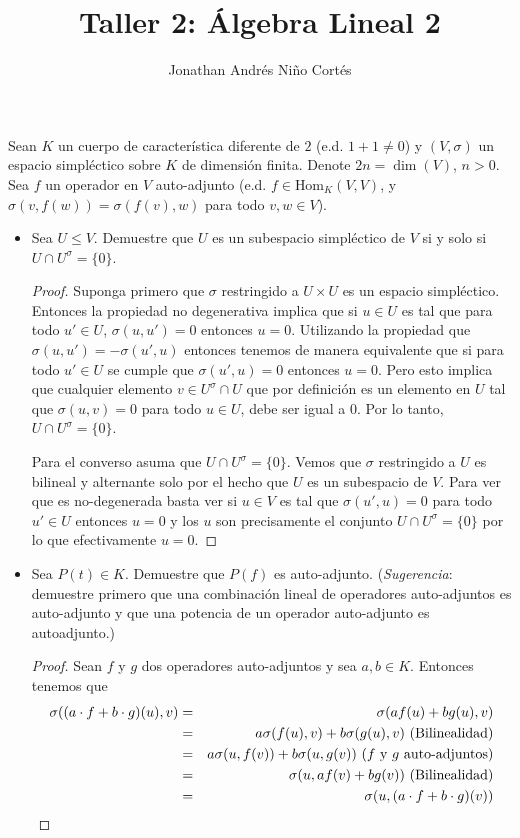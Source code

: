 \documentclass[letter,twoside,12pt]{article}
\title{Taller 2: Álgebra Lineal 2}
\author{Jonathan Andrés Niño Cortés}
\newcommand{\Hom}{\textrm{Hom}}
\begin{document}
\pagestyle{empty}
\maketitle
\vspace{0.5cm}

Sean $K$ un cuerpo de caracter\'istica diferente de $2$ (e.d. $1+1\ne 0$) y $(V,\sigma)$ un espacio simpl\'ectico sobre $K$ de dimensi\'on finita. Denote $2n=\dim(V)$, $n>0$. Sea $f$ un operador en $V$ auto-adjunto (e.d. $f\in\Hom_K(V,V)$, y $\sigma(v,f(w))=\sigma(f(v),w)$ para todo $v,w\in V$).

\begin{itemize}
\item Sea $U\le V$. Demuestre que $U$ es un subespacio simpl\'ectico de $V$ si y solo si $U\cap U^\sigma=\{0\}$.

\begin{proof}
Suponga primero que $ \sigma $ restringido a $ U \times U $ es un espacio simpléctico. Entonces la propiedad no degenerativa implica que si $ u \in U $ es tal que para todo $ u' \in U $, $ \sigma(u,u')=0 $ entonces $ u = 0 $. Utilizando la propiedad que $ \sigma(u,u')=-\sigma(u',u) $ entonces tenemos de manera equivalente que si para todo $ u' \in U $ se cumple que $ \sigma(u',u) = 0 $ entonces $ u = 0 $. Pero esto implica que cualquier elemento $ v \in U^\sigma \cap U $ que por definición es un elemento en $ U $ tal que $ \sigma(u,v)=0 $ para todo $ u \in U $, debe ser igual a 0. Por lo tanto, $ U \cap U^\sigma = \{0\} $.

Para el converso asuma que $ U \cap U^\sigma = \{0\} $. Vemos que $ \sigma $ restringido a $ U $ es bilineal y alternante solo por el hecho que $ U $ es un subespacio de $ V $. Para ver que es no-degenerada basta ver si $ u  \in V $ es tal que $ \sigma(u',u)=0 $ para todo $ u' \in U $ entonces $ u = 0 $ y los $ u $ son precisamente el conjunto $ U \cap U^\sigma= \{0\} $ por lo que efectivamente $ u = 0 $. 
\end{proof}

\item Sea $P(t)\in K$. Demuestre que $P(f)$ es auto-adjunto. (\emph{Sugerencia}: demuestre primero que una combinación lineal de operadores auto-adjuntos es auto-adjunto y que una potencia de un operador auto-adjunto es autoadjunto.)

\begin{proof}
Sean $ f $ y $ g $ dos operadores auto-adjuntos y sea $ a,b \in K $. Entonces tenemos que
\begin{eqnarray}
\sigma((a\cdot f+b\cdot g)(u),v)&=&\sigma(af(u)+bg(u),v) \nonumber
\\&=& a\sigma(f(u),v)+b\sigma(g(u),v) \text{ (Bilinealidad)}\nonumber
\\&=& a\sigma(u,f(v))+b\sigma(u,g(v)) \text{ ($f$ y $ g $ auto-adjuntos)}\nonumber
\\&=& \sigma(u,af(v)+bg(v))\text{ (Bilinealidad)}\nonumber
\\&=& \sigma(u,(a \cdot f+b \cdot g)(v))\nonumber
\end{eqnarray}


\end{proof}
\end{itemize}
\end{document}
